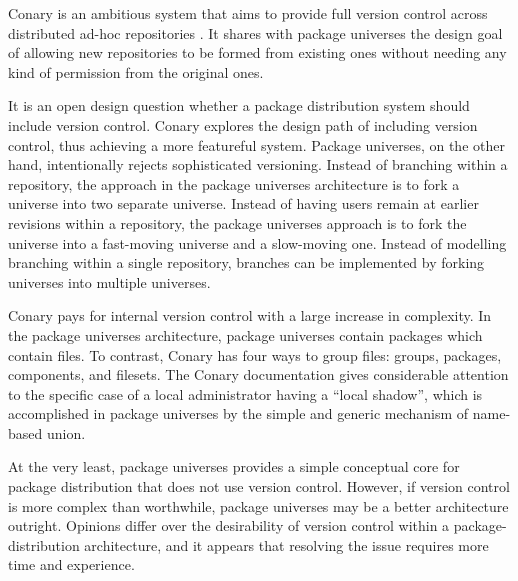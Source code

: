 \documentclass{article}
\begin{document}
Conary is an ambitious system that aims to provide full version
control across distributed ad-hoc repositories \cite{conary:web}.
It shares with
package universes the design goal of allowing new repositories to be
formed from existing ones without needing any kind of permission from
the original ones.

It is an open design question whether a package distribution system
should include version control.  Conary explores the design path of
including version control, thus achieving a more featureful system.
Package universes, on the other hand, intentionally rejects
sophisticated versioning.  Instead of branching
within a repository, the approach in the package universes
architecture is to fork a universe into two separate universe.
Instead of having users remain at earlier revisions within a
repository, the package universes approach is to fork the universe
into a fast-moving universe and a slow-moving one.  Instead of modelling
branching within a single repository, branches can be implemented
by forking universes into multiple universes.

Conary pays for internal version control with a large increase in
complexity.  In the package universes architecture, package universes
contain packages which contain files.  To contrast, Conary has four
ways to group files: groups, packages, components, and filesets.  The
Conary documentation gives considerable attention to the specific case
of a local administrator having a ``local shadow'', which is
accomplished in package universes by the simple and generic mechanism of
name-based union.


At the very least, package universes provides a simple conceptual core
for package distribution that does not use version control.  However,
if version control is more complex than worthwhile, package universes
may be a better architecture outright.  Opinions differ over the
desirability of version control within a package-distribution
architecture, and it appears that resolving the issue requires more
time and experience.




\end{document}
